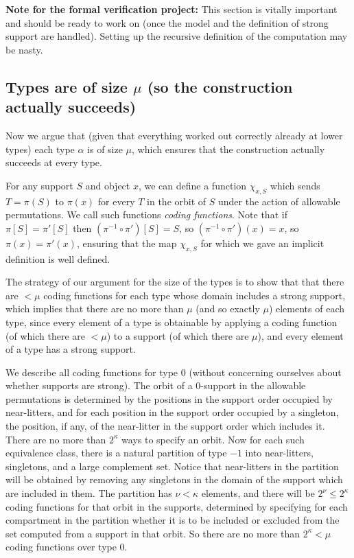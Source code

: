 \documentclass[112pt]{article}
\begin{document}
{\bf Note for the formal verification project:}  This section is vitally important and should be ready to work on (once the model and the definition of strong support are handled).  Setting up the recursive definition of the computation may be nasty.

\newpage
\subsection{Types are of size $\mu$ (so the construction actually succeeds)}

Now we argue that (given that everything worked out correctly already at lower types) each type $\alpha$ is of size $\mu$, which ensures
that the construction actually succeeds at every type.



For any support $S$ and object $x$, we can define a function $\chi_{x,S}$ which sends $T=\pi(S)$ to $\pi(x)$ for every $T$ in the orbit of $S$ under
the action of allowable permutations.  We call such functions {\em coding functions\/}.  Note that if $\pi[S]=\pi'[S]$ then $(\pi^{-1}\circ \pi')[S]= S$, so 
$(\pi^{-1}\circ \pi')(x)= x$, so $\pi(x)=\pi'(x)$, ensuring that the map $\chi_{x,S}$ for which we gave an implicit definition is well defined.

The strategy of our argument for the size of the types is to show that that there are $<\mu$ coding functions for each type whose domain includes a strong support, which implies that there are no more than $\mu$ (and so exactly $\mu$) elements of each type, since every element of a type is obtainable by applying a coding function (of which there are $<\mu$) to a support (of which there are $\mu$), and every element of a type has a strong support.

We describe all coding functions for type 0 (without concerning ourselves about whether supports are strong).  The orbit of a 0-support in the allowable permutations is determined by the positions in the support order occupied by near-litters, and for each position in the support order occupied by a singleton, the position, if any, of the near-litter in the support order which includes it.  There are no more than $2^\kappa$ ways to specify an orbit.  Now for each such equivalence class, there is a natural partition of type $-1$ into near-litters, singletons, and a large complement set.  Notice that near-litters in the partition will be obtained by removing any singletons in the domain of the support which are included in them.  The partition has $\nu<\kappa$ elements, and there will be $2^\nu\leq 2^\kappa$ coding functions for that orbit in the supports, determined by specifying for each compartment in the partition whether it is to be included or excluded from the set computed from a support in that orbit.  So there are no more than $2^\kappa<\mu$ coding functions over type 0.
\end{document}
